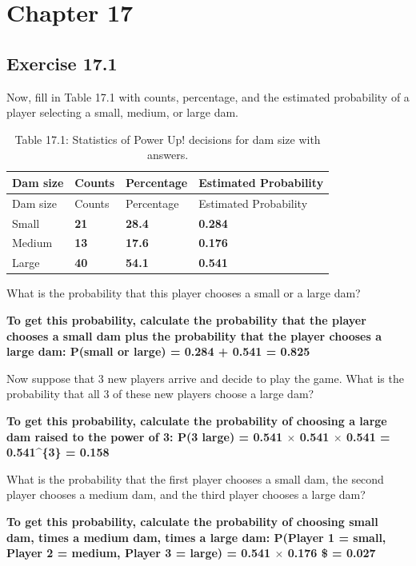\documentclass[
  openany]{scrbook}
\begin{document}
\hypertarget{chapter-17}{%
\section{Chapter 17}\label{chapter-17}}

\hypertarget{exercise-17.1}{%
\subsection{Exercise 17.1}\label{exercise-17.1}}

Now, fill in Table 17.1 with counts, percentage, and the estimated probability of a player selecting a small, medium, or large dam.

\begin{longtable}[]{@{}llll@{}}
\caption{Table 17.1: Statistics of Power Up! decisions for dam size with answers.}\tabularnewline
\toprule
Dam size & Counts & Percentage & Estimated Probability \\
\midrule
\endfirsthead
\toprule
Dam size & Counts & Percentage & Estimated Probability \\
\midrule
\endhead
Small & \textbf{21} & \textbf{28.4} & \textbf{0.284} \\
Medium & \textbf{13} & \textbf{17.6} & \textbf{0.176} \\
Large & \textbf{40} & \textbf{54.1} & \textbf{0.541} \\
\bottomrule
\end{longtable}

What is the probability that this player chooses a small or a large dam?

\textbf{To get this probability, calculate the probability that the player chooses a small dam plus the probability that the player chooses a large dam: P(small or large) = 0.284 + 0.541 = 0.825}

Now suppose that 3 new players arrive and decide to play the game. What is the probability that all 3 of these new players choose a large dam?

\textbf{To get this probability, calculate the probability of choosing a large dam raised to the power of 3: P(3 large) = 0.541 \(\times\) 0.541 \(\times\) 0.541 = 0.541\^{}\{3\} = 0.158}

What is the probability that the first player chooses a small dam, the second player chooses a medium dam, and the third player chooses a large dam?

\textbf{To get this probability, calculate the probability of choosing small dam, times a medium dam, times a large dam: P(Player 1 = small, Player 2 = medium, Player 3 = large) = 0.541 \(\times\) 0.176 \$ = 0.027}
\end{document}
